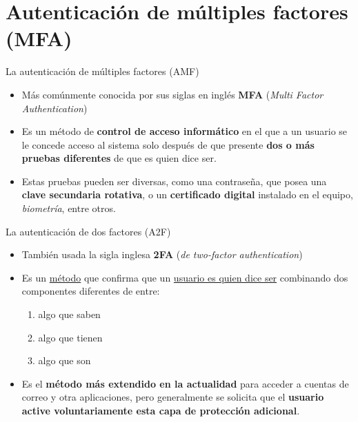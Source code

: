
\section{Autenticación de múltiples factores (MFA)}

\begin{frame}[c]{La autenticación de múltiples factores (AMF)}
  \begin{itemize}
    \item Más comúnmente conocida por sus siglas en inglés \textbf{MFA}
      (\emph{Multi Factor Authentication})

    \pausa
    \item Es un método de \textbf{control de acceso informático} en el
      que a un usuario se le concede acceso al sistema solo después de que
      presente \textbf{dos o más pruebas diferentes} de que es quien dice ser.

    \pausa
    \item Estas pruebas pueden ser diversas, como una contraseña, que
      posea una \textbf{clave secundaria rotativa}, o un \textbf{certificado
      digital} instalado en el equipo, \emph{biometría}, entre otros.
  \end{itemize}
\end{frame}

\begin{frame}[c]{La autenticación de dos factores (A2F)}
  \begin{itemize}
    \item También usada la sigla inglesa \textbf{2FA} (\emph{de two-factor
      authentication})

    \pausa
    \item Es un \underline{método} que confirma que un \underline{usuario
      es quien dice ser} combinando dos componentes diferentes de entre:
      \begin{enumerate}
        \item algo que saben
        \item algo que tienen
        \item algo que son
      \end{enumerate}

    \pausa
    \item Es el \textbf{método más extendido en la actualidad} para acceder a
      cuentas de correo y otra aplicaciones, pero generalmente se solicita que
      el \textbf{usuario active voluntariamente esta capa de protección
      adicional}.
  \end{itemize}
\end{frame}


